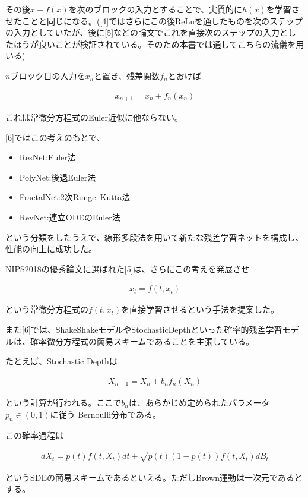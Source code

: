 \documentclass{jsarticle}
\begin{document}
その後$x+f(x)$を次のブロックの入力とすることで、実質的に$h(x)$を学習させたことと同じになる。([4]ではさらにこの後ReLuを通したものを次のステップの入力としていたが、後に[5]などの論文でこれを直接次のステップの入力としたほうが良いことが検証されている。そのため本書では通してこちらの流儀を用いる)

$n$ブロック目の入力を$x_n$と置き、残差関数$f_n$とおけば

\begin{align}
x_{n+1}=x_n+f_n(x_n)
\end{align}

これは常微分方程式のEuler近似に他ならない。




[6]ではこの考えのもとで、

\begin{itemize}
\item ResNet:Euler法
\item PolyNet:後退Euler法
\item FractalNet:2次Runge–Kutta法
\item RevNet:連立ODEのEuler法
\end{itemize}

という分類をしたうえで、線形多段法を用いて新たな残差学習ネットを構成し、性能の向上に成功した。

NIPS2018の優秀論文に選ばれた[5]は、さらにこの考えを発展させ

\begin{align}
\dot{x_t}=f(t,x_t)
\end{align}

という常微分方程式の$f(t,x_t)$を直接学習させるという手法を提案した。

また[6]では、ShakeShakeモデルやStochasticDepthといった確率的残差学習モデルは、確率微分方程式の簡易スキームであることを主張している。

たとえば、Stochastic Depthは

\begin{align}
X_{n+1}=X_n+b_nf_n(X_n)
\end{align}

という計算が行われる。ここで$b_n$は、あらかじめ定められたパラメータ$p_n\in(0,1)$に従う Bernoulli分布である。

この確率過程は

\begin{align}
dX_t=p(t)f(t,X_t)dt+\sqrt{p(t)(1-p(t))}f(t,X_t)dB_t
\end{align}

というSDEの簡易スキームであるといえる。ただしBrown運動は一次元であるとする。
\end{document}
